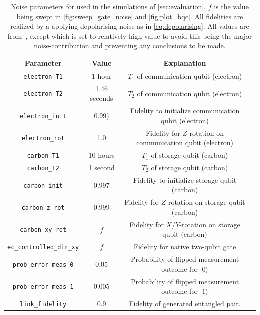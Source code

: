 \begin{table}
  \centering
  \begin{tabular}{||c|c|c|c||}
    \hline
    Parameter                 & Value        & Explanation                                                 \\
    \hline\hline
    \texttt{electron\_T1}          & 1 hour       & $T_1$ of communication qubit (electron)                     \\
    \texttt{electron\_T2}          & 1.46 seconds & $T_2$ of communication qubit (electron)                     \\
    \texttt{electron\_init}        & 0.99)        & Fidelity to initialize communication qubit (electron)       \\
    \texttt{electron\_rot}         & 1.0          & Fidelity for $Z$-rotation on communication qubit (electron) \\
    \texttt{carbon\_T1}            & 10 hours     & $T_1$ of storage qubit (carbon)                             \\
    \texttt{carbon\_T2}            & 1 second     & $T_2$ of storage qubit (carbon)                             \\
    \texttt{carbon\_init}          & 0.997        & Fidelity to initialize storage qubit (carbon)               \\
    \texttt{carbon\_z\_rot}         & 0.999        & Fidelity for $Z$-rotation on storage qubit (carbon)         \\
    \texttt{carbon\_xy\_rot}        & $f$          & Fidelity for $X$/$Y$-rotation on storage qubit (carbon)     \\
    \texttt{ec\_controlled\_dir\_xy} & $f$          & Fidelity for native two-qubit gate                          \\
    \texttt{prob\_error\_meas\_0}    & 0.05         & Probability of flipped measurement outcome for $|0\rangle$  \\
    \texttt{prob\_error\_meas\_1}    & 0.005        & Probability of flipped measurement outcome for $|1\rangle$  \\
    \texttt{link\_fidelity}        & 0.9          & Fidelity of generated entangled pair.                       \\
    \hline
  \end{tabular}
  \caption{
    Noise parameters for used in the simulations of \cref{sec:evaluation}.
    $f$ is the value being swept in \cref{fig:sweep_gate_noise} and \cref{fig:plot_bqc}.
    All fidelities are realized by a applying depolarising noise as in \cref{eq:depolarising}.
    All values are from~\cite{coopmans2021netsquid}, except  which is set to relatively high value to avoid this being the major noise-contribution and preventing any conclusions to be made.
  }\label{tab:noise}
\end{table}

